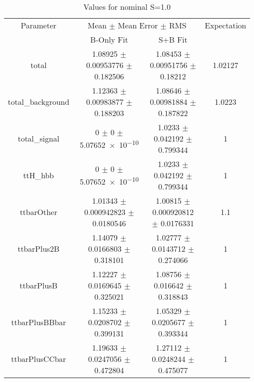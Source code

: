 \begin{table}
\centering
\caption{Values for nominal S=1.0}
\begin{tabular}{cccc}
\toprule
Parameter & \multicolumn{2}{c}{Mean $\pm$ Mean Error $\pm$ RMS} & Expectation\\
 & B-Only Fit & S+B Fit & \\
\midrule
total & \num{1.08925} $\pm$ \num{0.00953776} $\pm$ \num{0.182506} & \num{1.08453} $\pm$ \num{0.00951756} $\pm$ \num{0.18212} & \num{1.02127}\\
total\_background & \num{1.12363} $\pm$ \num{0.00983877} $\pm$ \num{0.188203} & \num{1.08646} $\pm$ \num{0.00981884} $\pm$ \num{0.187822} & \num{1.0223}\\
total\_signal & \num{0} $\pm$ \num{0} $\pm$ \num{5.07652e-10} & \num{1.0233} $\pm$ \num{0.042192} $\pm$ \num{0.799344} & \num{1}\\
ttH\_hbb & \num{0} $\pm$ \num{0} $\pm$ \num{5.07652e-10} & \num{1.0233} $\pm$ \num{0.042192} $\pm$ \num{0.799344} & \num{1}\\
ttbarOther & \num{1.01343} $\pm$ \num{0.000942823} $\pm$ \num{0.0180546} & \num{1.00815} $\pm$ \num{0.000920812} $\pm$ \num{0.0176331} & \num{1.1}\\
ttbarPlus2B & \num{1.14079} $\pm$ \num{0.0166803} $\pm$ \num{0.318101} & \num{1.02777} $\pm$ \num{0.0143712} $\pm$ \num{0.274066} & \num{1}\\
ttbarPlusB & \num{1.12227} $\pm$ \num{0.0169645} $\pm$ \num{0.325021} & \num{1.08756} $\pm$ \num{0.016642} $\pm$ \num{0.318843} & \num{1}\\
ttbarPlusBBbar & \num{1.15233} $\pm$ \num{0.0208702} $\pm$ \num{0.399131} & \num{1.05329} $\pm$ \num{0.0205677} $\pm$ \num{0.393344} & \num{1}\\
ttbarPlusCCbar & \num{1.19633} $\pm$ \num{0.0247056} $\pm$ \num{0.472804} & \num{1.27112} $\pm$ \num{0.0248244} $\pm$ \num{0.475077} & \num{1}\\
\bottomrule
\end{tabular}
\end{table}
